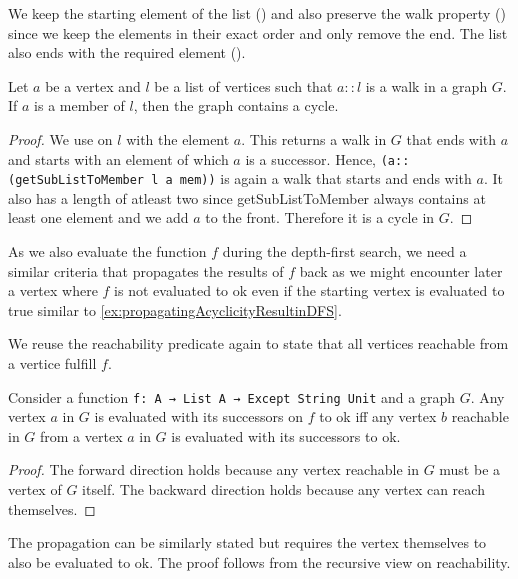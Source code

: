 \noindent We keep the starting element of the list (\getSubListToMemberPreservesFront) and also preserve the walk property (\getSubListToMemberPreservesWalk) since we keep the elements in their exact order and only remove the end. The list also ends with the required element (\getSubListToMemberEndsWithElement). 

\begin{lemma}[\frontRepetitionInWalkImpliesCycle]
  Let $a$ be a vertex and $l$ be a list of vertices such that $a::l$ is a walk in a graph $G$. If $a$ is a member of $l$, then the graph contains a cycle.
\end{lemma}
\begin{proof}
  We use \getSubListToMember on $l$ with the element $a$. This returns a walk in $G$ that ends with $a$ and starts with an element of which $a$ is a successor. Hence, \lstinline|(a::(getSubListToMember l a mem))| is again a walk that starts and ends with $a$. It also has a length of atleast two since getSubListToMember always contains at least one element and we add $a$ to the front. Therefore it is a cycle in $G$.
\end{proof}

As we also evaluate the function $f$ during the depth-first search, we need a similar criteria that propagates the results of $f$ back as we might encounter later a vertex where $f$ is not evaluated to ok even if the starting vertex is evaluated to true similar to \cref{ex:propagatingAcyclicityResultinDFS}.

We reuse the reachability predicate again to state that all vertices reachable from a vertice fulfill $f$.

\begin{lemma}[\allTrueIfAllCanReachTrue]\label{lem:allTrueIfAllCanReachTrue}
  Consider a function \lstinline|f: A → List A → Except String Unit| and a graph $G$. Any vertex $a$ in $G$ is evaluated with its successors on $f$ to ok iff any vertex $b$ reachable in $G$ from a vertex $a$ in $G$ is evaluated with its successors to ok.
\end{lemma}
\begin{proof}
  The forward direction holds because any vertex reachable in $G$ must be a vertex of $G$ itself. The backward direction holds because any vertex can reach themselves.
\end{proof}

The propagation can be similarly stated but requires the vertex themselves to also be evaluated to ok. The proof follows from the recursive view on reachability.

